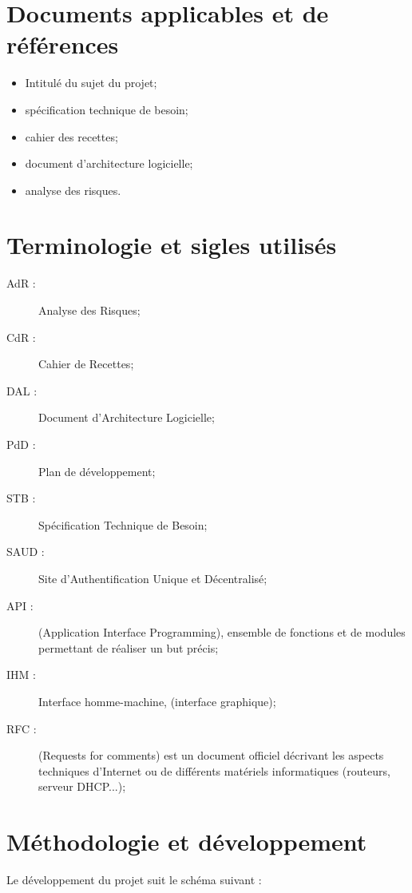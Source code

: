 \documentclass[a4paper,11pt,french]{article}
\begin{document}
\section{Documents applicables et de références}
\begin{itemize}
 \item Intitulé du sujet du projet;
 \item spécification technique de besoin;
 \item cahier des recettes;
 \item document d'architecture logicielle;
 \item analyse des risques.
\end{itemize}

\section{Terminologie et sigles utilisés}
\begin{description}
	\item[AdR :] Analyse des Risques;
	\item[CdR :] Cahier de Recettes;
	\item[DAL :] Document d'Architecture Logicielle;
	\item[PdD :] Plan de développement;
	\item[STB :] Spécification Technique de Besoin;
	\item[SAUD :] Site d'Authentification Unique et Décentralisé;
	\item[API :] (Application Interface Programming), ensemble de fonctions
et de modules permettant de réaliser un but précis;
	\item[IHM :] Interface homme-machine, (interface graphique);
	\item[RFC :] (Requests for comments) est un document officiel décrivant
les aspects techniques d'Internet
	ou de différents matériels informatiques (routeurs, serveur DHCP...);
\end{description}

\section{Méthodologie et développement}
Le développement du projet suit le schéma suivant : \\

\begin{center}
\end{center}
\end{document}
